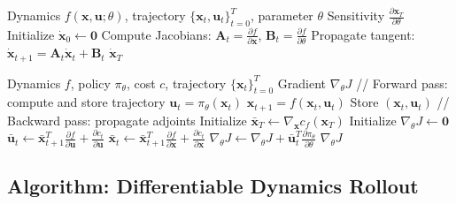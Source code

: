 \begin{algorithm}[H]
\caption{Forward Mode AD for Control Sensitivity}
\label{alg:forward_ad}
\begin{algorithmic}[1]
\REQUIRE Dynamics $f(\mathbf{x}, \mathbf{u}; \theta)$, trajectory $\{\mathbf{x}_t, \mathbf{u}_t\}_{t=0}^{T}$, parameter $\theta$
\ENSURE Sensitivity $\frac{\partial \mathbf{x}_T}{\partial \theta}$
\STATE Initialize $\dot{\mathbf{x}}_0 \gets \mathbf{0}$ 
    \STATE Compute Jacobians: $\mathbf{A}_t = \frac{\partial f}{\partial \mathbf{x}}$, $\mathbf{B}_t = \frac{\partial f}{\partial \theta}$
    \STATE Propagate tangent: $\dot{\mathbf{x}}_{t+1} = \mathbf{A}_t \dot{\mathbf{x}}_t + \mathbf{B}_t$
\ENDFOR
\RETURN $\dot{\mathbf{x}}_T$
\end{algorithmic}
\end{algorithm}

\begin{algorithm}[H]
\caption{Reverse Mode AD for Policy Gradient}
\label{alg:reverse_ad}
\begin{algorithmic}[1]
\REQUIRE Dynamics $f$, policy $\pi_\theta$, cost $c$, trajectory $\{\mathbf{x}_t\}_{t=0}^{T}$
\ENSURE Gradient $\nabla_\theta J$
\STATE // Forward pass: compute and store trajectory
    \STATE $\mathbf{u}_t = \pi_\theta(\mathbf{x}_t)$
    \STATE $\mathbf{x}_{t+1} = f(\mathbf{x}_t, \mathbf{u}_t)$
    \STATE Store $(\mathbf{x}_t, \mathbf{u}_t)$
\ENDFOR
\STATE // Backward pass: propagate adjoints
\STATE Initialize $\bar{\mathbf{x}}_T \gets \nabla_{\mathbf{x}} c_f(\mathbf{x}_T)$
\STATE Initialize $\nabla_\theta J \gets \mathbf{0}$
    \STATE $\bar{\mathbf{u}}_t \gets \bar{\mathbf{x}}_{t+1}^T \frac{\partial f}{\partial \mathbf{u}} + \frac{\partial c_t}{\partial \mathbf{u}}$
    \STATE $\bar{\mathbf{x}}_t \gets \bar{\mathbf{x}}_{t+1}^T \frac{\partial f}{\partial \mathbf{x}} + \frac{\partial c_t}{\partial \mathbf{x}}$
    \STATE $\nabla_\theta J \gets \nabla_\theta J + \bar{\mathbf{u}}_t^T \frac{\partial \pi_\theta}{\partial \theta}$
\ENDFOR
\RETURN $\nabla_\theta J$
\end{algorithmic}
\end{algorithm}

\subsection{Algorithm: Differentiable Dynamics Rollout}

